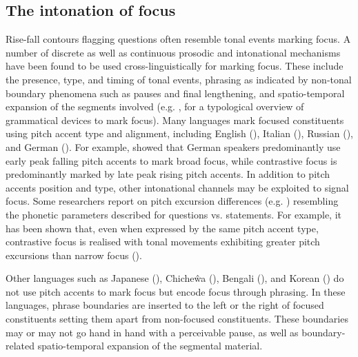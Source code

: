 \subsection{The intonation of focus}
Rise-fall contours flagging questions often resemble tonal events marking focus. A number of discrete as well as continuous prosodic and intonational mechanisms have been found to be used cross-linguistically for marking focus. These include the presence, type, and timing of tonal events, phrasing as indicated by non-tonal boundary phenomena such as pauses and final lengthening, and spatio-temporal expansion of the segments involved (e.g. \citealt{Buring2009}, for a typological overview of grammatical devices to mark focus). Many languages mark focused constituents using pitch accent type and alignment, including English (\citealt{Pierr1980,PierrHirsch1990,Jun2005}), Italian (\citealt{Grice.etal2005ita}), Russian (\citealt{MeyerMleinek2006}), and German (\citealt{Grice.etal2005ger,Grice.etal.accepted}). For example, \citet{Grice.etal.accepted} showed that German speakers predominantly use early peak falling pitch accents to mark broad focus, while contrastive focus is predominantly marked by late peak rising pitch accents. In addition to pitch accents position and type, other intonational channels may be exploited to signal focus. Some researchers report on pitch excursion differences (e.g. \citealt{Pierr1980,LibermanPierr1984,Braun2006,Grice.etal.accepted}) resembling the phonetic parameters described for questions vs. statements. For example, it has been shown that, even when expressed by the same pitch accent type, contrastive focus is realised with tonal movements exhibiting greater pitch excursions than narrow focus (\citealt{Grice.etal.accepted}). 

Other languages such as Japanese (\citealt{BeckmanPierr1986}), Chicheŵa (\citealt{Kanerva1990}), Bengali (\citealt{HayesLahiri1991}), and Korean  (\citealt{Jun2005}) do not use pitch accents to mark focus but encode focus through phrasing. In these languages, phrase boundaries are inserted to the left or the right of focused constituents setting them apart from non-focused constituents. These boundaries may or may not go hand in hand with a perceivable pause, as well as boundary-related spatio-temporal expansion of the segmental material. 

